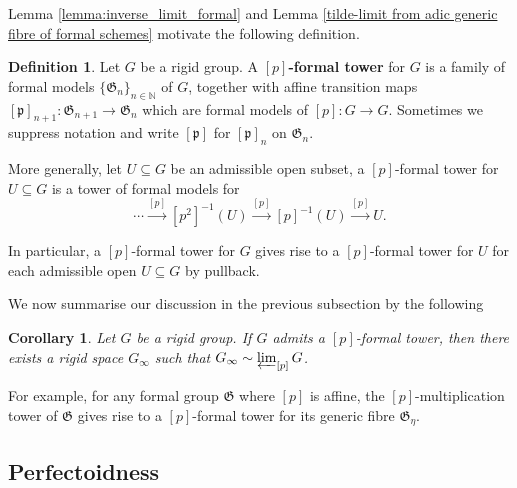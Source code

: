 \documentclass[10pt,oneside]{amsart}
\newtheorem{corollary}[theorem]{Corollary}
\theoremstyle{definition}
\newtheorem{definition}[theorem]{Definition}
\begin{document}
	Lemma \ref{lemma:inverse_limit_formal} and Lemma \ref{tilde-limit from adic generic fibre of formal schemes} motivate the following definition. 
	\begin{definition}
		Let $G$ be a rigid group. A \textbf{$[p]$-formal tower} for $G$ is  a family of formal models $\{\mathfrak G_n\}_{n\in \mathbb N}$ of $G$, together with affine transition maps $[\mathfrak p]_{n+1}:\mathfrak G_{n+1}\rightarrow \mathfrak G_{n}$ which are formal models of $[p]:G\rightarrow G$. Sometimes we suppress notation and write $[\mathfrak p]$ for $[\mathfrak p]_{n}$ on $\mathfrak G_n$. 
		
		More generally, let $U\subseteq G$ be an admissible open subset, a $[p]$-formal tower for $U \subseteq G$ is a tower of formal models for 
$$ \cdots \xrightarrow{[p]} [p^2]^{-1} (U)   \xrightarrow{[p]} [p]^{-1} (U)  \xrightarrow{[p]} U. $$ 
	\end{definition}
	

In particular, a $[p]$-formal tower for $G$ gives rise to a $[p]$-formal tower for $U$ for each admissible open $U \subseteq G$ by pullback. 

\begin{comment}	\begin{center}
		\begin{tikzcd}
			\dots \arrow[r] & \left [p^2\right]^{-1}(U) \arrow[r, "{[p]}"] \arrow[d, hook'] & \left [p\right]^{-1}(U) \arrow[r, "{[p]}"] \arrow[d, hook'] & U \arrow[d, hook'] \\
			\dots \arrow[r, "{[p]}"] & G \arrow[r, "{[p]}"] & G \arrow[r, "{[p]}"] & G
		\end{tikzcd}
	\end{center}  \end{comment}
	
	We now summarise our discussion in the previous subsection by the following
	\begin{corollary}
		Let $G$ be a rigid group. If $G$ admits a $[p]$-formal tower, then there exists a rigid space $G_\infty$ such that $G_\infty \sim \varprojlim_{[p]}G$.
	\end{corollary}
	For example, for any formal group $\mathfrak G$ where $[p]$ is affine, the $[p]$-multiplication tower of $\mathfrak G$ gives rise to a $[p]$-formal tower for its generic fibre $\mathfrak G_\eta$. 
	
	
	
	
	\subsection{Perfectoidness}  \label{subsection:perfectoid_tilde_limit}
\end{document}
